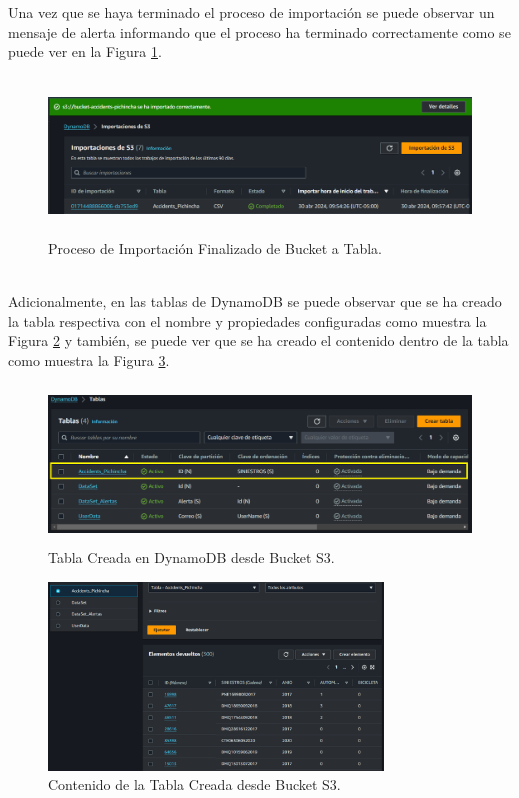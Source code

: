\documentclass[a4paper,10pt, oneside, titlepage]{article}
\begin{document}
	\indent Una vez que se haya terminado el proceso de importación se puede observar un mensaje de alerta informando que el proceso ha terminado correctamente como se puede ver en la Figura \ref{Proceso_Importacion_Finalizado_Bucket_Tabla}.
	\begin{figure}[!h]
		\centering
		\includegraphics[width = 1\linewidth, height = 4.2cm]{Proceso_Importacion_Finalizado_Bucket_Tabla.png}
		\caption{Proceso de Importación Finalizado de Bucket a Tabla.}
		\label{Proceso_Importacion_Finalizado_Bucket_Tabla}
	\end{figure} \\
	\indent Adicionalmente, en las tablas de DynamoDB se puede observar que se ha creado la tabla respectiva con el nombre y propiedades configuradas como muestra la Figura \ref{Tabla_Creada_Bucket_S3} y también, se puede ver que se ha creado el contenido dentro de la tabla como muestra la Figura \ref{Contenido_Tabla_Creada_Bucket_S3}.
	\begin{figure}[!h]
		\centering
		\includegraphics[width = 1\linewidth, height = 4.2cm]{Tabla_Creada_Bucket_S3.png}
		\caption{Tabla Creada en DynamoDB desde Bucket S3.}
		\label{Tabla_Creada_Bucket_S3}
	\end{figure}
	\begin{figure}[!h]
		\centering
		\includegraphics[width = 1\linewidth, height = 5cm]{Contenido_Tabla_Creada_Bucket_S3.png}
		\caption{Contenido de la Tabla Creada desde Bucket S3.}
		\label{Contenido_Tabla_Creada_Bucket_S3}
	\end{figure} \\
\end{document}
